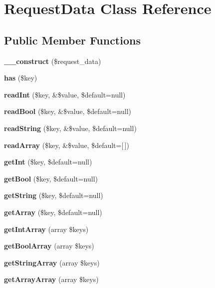 \section{Request\+Data Class Reference}
\label{class_request_data}
\subsection*{Public Member Functions}
\begin{DoxyCompactItemize}
\item 
\mbox{\label{class_request_data_a669382ca8209546c1fc5b69805e246b8}} 
{\bfseries \+\_\+\+\_\+construct} (\$request\+\_\+data)
\item 
\mbox{\label{class_request_data_a8b23dbb48f0c3c94725695191d06981a}} 
{\bfseries has} (\$key)
\item 
\mbox{\label{class_request_data_afc5fb78e5e7b38a63f47c60d59b76083}} 
{\bfseries read\+Int} (\$key, \&\$value, \$default=null)
\item 
\mbox{\label{class_request_data_a4195c2ac041f755cc109d09db8ca856f}} 
{\bfseries read\+Bool} (\$key, \&\$value, \$default=null)
\item 
\mbox{\label{class_request_data_ac63931fd6da0fd43e2a5ec496d5dfec5}} 
{\bfseries read\+String} (\$key, \&\$value, \$default=null)
\item 
\mbox{\label{class_request_data_a829933c7b0b8ddb5c59e7e23b1bb970d}} 
{\bfseries read\+Array} (\$key, \&\$value, \$default=[$\,$])
\item 
\mbox{\label{class_request_data_aa66e1367f11839054f97149dbfdddc12}} 
{\bfseries get\+Int} (\$key, \$default=null)
\item 
\mbox{\label{class_request_data_a19e53a2778353bd321daf84c70131a09}} 
{\bfseries get\+Bool} (\$key, \$default=null)
\item 
\mbox{\label{class_request_data_a05d694eeb9f165bd8e0245c06a34a807}} 
{\bfseries get\+String} (\$key, \$default=null)
\item 
\mbox{\label{class_request_data_af06da642a5e374ae44f35473971fe117}} 
{\bfseries get\+Array} (\$key, \$default=null)
\item 
\mbox{\label{class_request_data_a853b5161c2de226a00f31fb6dfcbd93d}} 
{\bfseries get\+Int\+Array} (array \$keys)
\item 
\mbox{\label{class_request_data_ad00cd3a1c703f0a7e2df35d873b3fd01}} 
{\bfseries get\+Bool\+Array} (array \$keys)
\item 
\mbox{\label{class_request_data_a0566129c074d52a4db99520e7092b68c}} 
{\bfseries get\+String\+Array} (array \$keys)
\item 
\mbox{\label{class_request_data_a9197f1583e1ad33cbd28fbc10b339fb5}} 
{\bfseries get\+Array\+Array} (array \$keys)
\end{DoxyCompactItemize}

